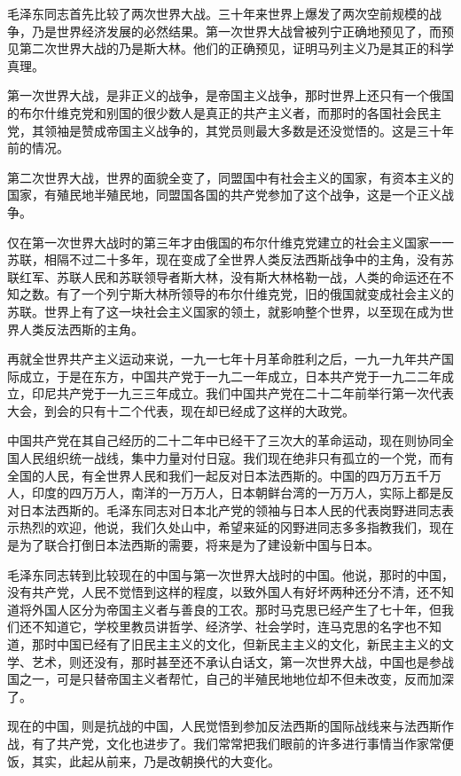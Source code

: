 毛泽东同志首先比较了两次世界大战。三十年来世界上爆发了两次空前规模的战争，乃是世界经济发展的必然结果。第一次世界大战曾被列宁正确地预见了，而预见第二次世界大战的乃是斯大林。他们的正确预见，证明马列主义乃是其正的科学真理。

第一次世界大战，是非正义的战争，是帝国主义战争，那时世界上还只有一个俄国的布尔什维克党和别国的很少数人是真正的共产主义者，而那时的各国社会民主党，其领袖是赞成帝国主义战争的，其党员则最大多数是还没觉悟的。这是三十年前的情况。

第二次世界大战，世界的面貌全变了，同盟国中有社会主义的国家，有资本主义的国家，有殖民地半殖民地，同盟国各国的共产党参加了这个战争，这是一个正义战争。

仅在第一次世界大战时的第三年才由俄国的布尔什维克党建立的社会主义国家一一苏联，相隔不过二十多年，现在变成了全世界人类反法西斯战争中的主角，没有苏联红军、苏联人民和苏联领导者斯大林，没有斯大林格勒一战，人类的命运还在不知之数。有了一个列宁斯大林所领导的布尔什维克党，旧的俄国就变成社会主义的苏联。世界上有了这一块社会主义国家的领土，就影响整个世界，以至现在成为世界人类反法西斯的主角。

再就全世界共产主义运动来说，一九一七年十月革命胜利之后，一九一九年共产国际成立，于是在东方，中国共产党于一九二一年成立，日本共产党于一九二二年成立，印尼共产党于一九三三年成立。我们中国共产党在二十二年前举行第一次代表大会，到会的只有十二个代表，现在却已经成了这样的大政党。

中国共产党在其自己经历的二十二年中已经干了三次大的革命运动，现在则协同全国人民组织统一战线，集中力量对付日寇。我们现在绝非只有孤立的一个党，而有全国的人民，有全世界人民和我们一起反对日本法西斯的。中国的四万万五千万人，印度的四万万人，南洋的一万万人，日本朝鲜台湾的一万万人，实际上都是反对日本法西斯的。毛泽东同志对日本北产党的领袖与日本人民的代表岗野进同志表示热烈的欢迎，他说，我们久处山中，希望来延的冈野进同志多多指教我们，现在是为了联合打倒日本法西斯的需要，将来是为了建设新中国与日本。

毛泽东同志转到比较现在的中国与第一次世界大战时的中国。他说，那时的中国，没有共产党，人民不觉悟到这样的程度，以致外国人有好坏两种还分不清，还不知道将外国人区分为帝国主义者与善良的工农。那时马克思已经产生了七十年，但我们还不知道它，学校里教员讲哲学、经济学、社会学时，连马克思的名字也不知道，那时中国已经有了旧民主主义的文化，但新民主主义的文化，新民主主义的文学、艺术，则还没有，那时甚至还不承认白话文，第一次世界大战，中国也是参战国之一，可是只替帝国主义者帮忙，自己的半殖民地地位却不但未改变，反而加深了。

现在的中国，则是抗战的中国，人民觉悟到参加反法西斯的国际战线来与法西斯作战，有了共产党，文化也进步了。我们常常把我们眼前的许多进行事情当作家常便饭，其实，此起从前来，乃是改朝换代的大变化。

